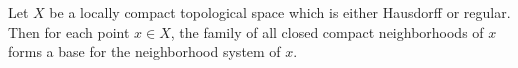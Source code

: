 Let $X$ be a locally compact topological space which is either Hausdorff or regular. Then for each point $x \in X$, the family of all closed compact neighborhoods of $x$ forms a base for the neighborhood system of $x$.
